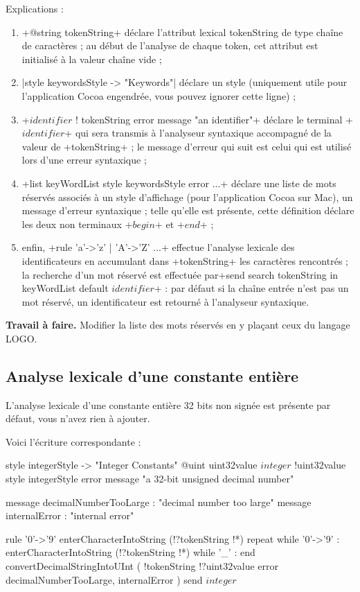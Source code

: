 Explications :
\begin{enumerate}
  \item \ggs+@string tokenString+ déclare l’attribut lexical tokenString de type chaîne de caractères ; au début de l’analyse de chaque token, cet attribut est initialisé à la valeur chaîne vide ;
  \item \ggs|style keywordsStyle -> "Keywords"| déclare un style (uniquement utile pour l’application Cocoa engendrée, vous pouvez ignorer cette ligne) ;
  \item \ggs+$identifier$ ! tokenString error message "an identifier"+ déclare le terminal \ggs+$identifier$+ qui sera transmis à l’analyseur syntaxique accompagné de la valeur de \ggs+tokenString+ ; le message d’erreur qui suit est celui qui est utilisé lors d’une erreur syntaxique ;
  \item \ggs+list keyWordList style keywordsStyle error ...+ déclare une liste de mots réservés associés à un style d’affichage (pour l’application Cocoa sur Mac), un message d’erreur syntaxique ; telle qu’elle est présente, cette définition déclare les deux non terminaux \ggs+$begin$+ et \ggs+$end$+ ;
  \item enfin, \ggs+rule 'a'->'z' | 'A'->'Z' ...+ effectue l’analyse lexicale des identificateurs en accumulant dans \ggs+tokenString+ les caractères rencontrés ; la recherche d'un mot réservé est effectuée par\ggs+send search tokenString in keyWordList default $identifier$+ : par défaut si la chaîne entrée n'est pas un mot réservé, un identificateur est retourné à l’analyseur syntaxique.
\end{enumerate}

\textbf{Travail à faire.} Modifier la liste des mots réservés en y plaçant ceux du langage LOGO.

\subsection{Analyse lexicale d'une constante entière}

L’analyse lexicale d’une constante entière 32 bits non signée est présente par défaut, vous n’avez rien à ajouter.

Voici l'écriture correspondante :
\begin{galgas}
style integerStyle -> "Integer Constants"
@uint uint32value
$integer$ !uint32value style integerStyle
               error message "a 32-bit unsigned decimal number"

message decimalNumberTooLarge : "decimal number too large"
message internalError : "internal error"

rule '0'->'9' {
  enterCharacterIntoString (!?tokenString !*)
  repeat
  while '0'->'9' :
    enterCharacterIntoString (!?tokenString !*)
  while '_' :
  end
  convertDecimalStringIntoUInt (
    !tokenString
    !?uint32value
    error decimalNumberTooLarge, internalError
  )
  send $integer$
}
\end{galgas}


